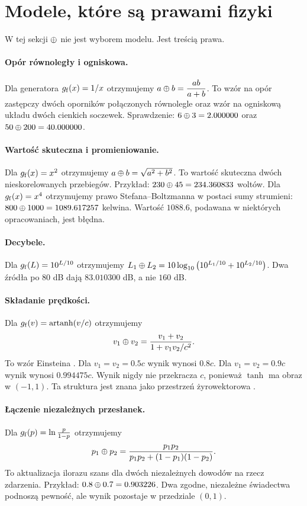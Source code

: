 \documentclass[11pt,a4paper]{article}
\begin{document}
\section{Modele, które są prawami fizyki}

W tej sekcji $\mathbin{\oplus}$ nie jest wyborem modelu. Jest treścią prawa.

\paragraph{Opór równoległy i ogniskowa.}
Dla generatora $g_{\mathrm{f}}(x)=1/x$ otrzymujemy
$a\mathbin{\oplus} b=\dfrac{ab}{a+b}$. To wzór na opór zastępczy dwóch oporników
połączonych równolegle oraz wzór na ogniskową układu dwóch cienkich soczewek.
Sprawdzenie: $6\mathbin{\oplus}3=2.000000$ oraz $50\mathbin{\oplus}200=40.000000$.

\paragraph{Wartość skuteczna i promieniowanie.}
Dla $g_{\mathrm{f}}(x)=x^{2}$ otrzymujemy $a\mathbin{\oplus} b=\sqrt{a^{2}+b^{2}}$. To wartość
skuteczna dwóch nieskorelowanych przebiegów. Przykład: $230\mathbin{\oplus}45=234.360833$
woltów. Dla $g_{\mathrm{f}}(x)=x^{4}$ otrzymujemy prawo Stefana--Boltzmanna w postaci
sumy strumieni: $800\mathbin{\oplus}1000=1089.617257$ kelwina. Wartość $1088.6$, podawana
w niektórych opracowaniach, jest błędna.

\paragraph{Decybele.}
Dla $g_{\mathrm{f}}(L)=10^{L/10}$ otrzymujemy
$L_{1}\mathbin{\oplus} L_{2}=10\log_{10}\big(10^{L_{1}/10}+10^{L_{2}/10}\big)$.
Dwa źródła po $80$ dB dają $83.010300$ dB, a nie $160$ dB.

\paragraph{Składanie prędkości.}
Dla $g_{\mathrm{f}}(v)=\operatorname{artanh}(v/c)$ otrzymujemy
\[
v_{1}\mathbin{\oplus} v_{2}=\frac{v_{1}+v_{2}}{1+v_{1}v_{2}/c^{2}}.
\]
To wzór Einsteina \cite{einstein1905}. Dla $v_{1}=v_{2}=0.5c$ wynik wynosi
$0.8c$. Dla $v_{1}=v_{2}=0.9c$ wynik wynosi $0.994475c$. Wynik nigdy nie
przekracza $c$, ponieważ $\tanh$ ma obraz w $(-1,1)$. Ta struktura jest znana
jako przestrzeń żyrowektorowa \cite{ungar2008}.

\paragraph{Łączenie niezależnych przesłanek.}
Dla $g_{\mathrm{f}}(p)=\ln\frac{p}{1-p}$ otrzymujemy
\[
p_{1}\mathbin{\oplus} p_{2}=\frac{p_{1}p_{2}}{p_{1}p_{2}+(1-p_{1})(1-p_{2})}.
\]
To aktualizacja ilorazu szans dla dwóch niezależnych dowodów na rzecz zdarzenia.
Przykład: $0.8\mathbin{\oplus}0.7=0.903226$. Dwa zgodne, niezależne świadectwa podnoszą
pewność, ale wynik pozostaje w przedziale $(0,1)$.
\end{document}
